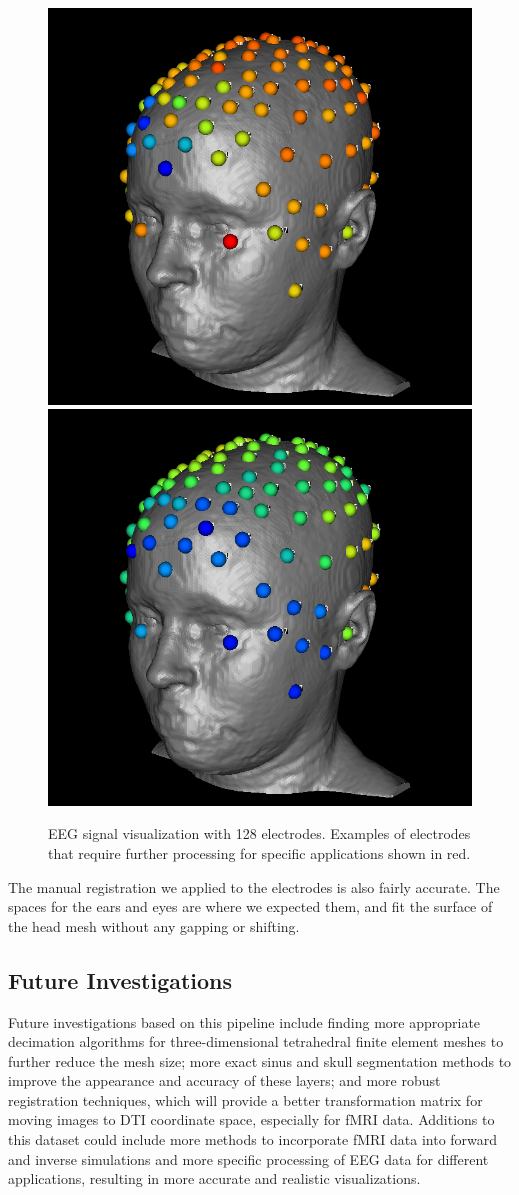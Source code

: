\begin{figure}[H]
\begin{center}
\includegraphics[width=.49\textwidth]{Figures/128_eeg_1}
\includegraphics[width=.49\textwidth]{Figures/128_eeg_2}
\caption{EEG signal visualization with 128 electrodes. Examples of electrodes that require further processing for specific applications shown in red.}
\label{fig:eegvis}
\end{center}
\end{figure}

The manual registration we applied to the electrodes is also fairly accurate. The spaces for the ears and eyes are where we expected them, and fit the surface of the head mesh without any gapping or shifting. 

\subsection{Future Investigations}

Future investigations based on this pipeline include finding more appropriate decimation algorithms for three-dimensional tetrahedral finite element meshes to further reduce the mesh size; more exact sinus and skull segmentation methods to improve the appearance and accuracy of these layers; and more robust registration techniques, which will provide a better transformation matrix for moving images to DTI coordinate space, especially for fMRI data. Additions to this dataset could include more methods to incorporate fMRI data into forward and inverse simulations and more specific processing of EEG data for different applications, resulting in more accurate and realistic visualizations. 


